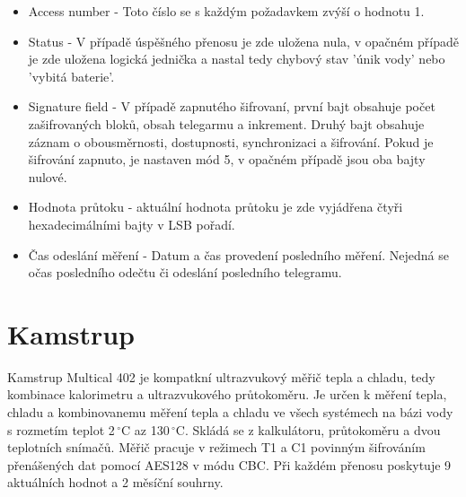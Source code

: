 \begin{itemize}
	\item Access number - Toto číslo se s každým požadavkem zvýší o hodnotu 1.
	\item Status - V případě úspěšného přenosu je zde uložena nula, v opačném případě je zde uložena logická jednička a nastal tedy chybový stav 'únik vody' nebo 'vybitá baterie'.
	\item Signature field - V případě zapnutého šifrovaní, první bajt obsahuje počet zašifrovaných bloků, obsah telegarmu a inkrement. Druhý bajt obsahuje záznam o obousměrnosti, dostupnosti, synchronizaci a šifrování. Pokud je šifrování zapnuto, je nastaven mód 5, v opačném případě jsou oba bajty nulové.
	\item Hodnota průtoku - aktuální hodnota průtoku je zde vyjádřena čtyři hexadecimálními bajty v LSB pořadí.
	\item Čas odeslání měření - Datum a čas provedení posledního měření. Nejedná se očas posledního odečtu či odeslání posledního telegramu.
\end{itemize}



	
	\section{Kamstrup}
	
	Kamstrup Multical 402 je kompatkní ultrazvukový měřič tepla a chladu, tedy kombinace kalorimetru a ultrazvukového průtokoměru. Je určen k měření tepla, chladu a kombinovanemu měření tepla a chladu ve všech systémech na bázi vody s rozmetím teplot 2\,$^{\circ}$C az 130\,$^{\circ}$C. Skládá se z kalkulátoru, průtokoměru a dvou teplotních snímačů. Měřič pracuje v režimech T1 a C1  povinným šifrováním přenášených dat pomocí AES128 v módu CBC. Při každém přenosu poskytuje 9 aktuálních hodnot a 2 měsíční souhrny.
	
